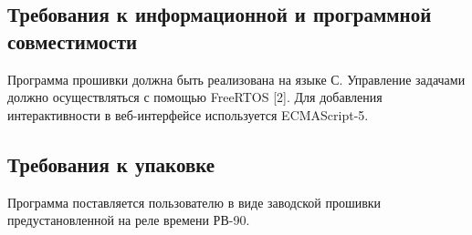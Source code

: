 \subsection{Требования к информационной и программной совместимости}
Программа прошивки должна быть реализована на языке С. Управление задачами должно осуществляться с помощью FreeRTOS [2]. Для добавления интерактивности в веб-интерфейсе используется ECMAScript-5.


\subsection{Требования к упаковке}
Программа поставляется пользователю в виде заводской прошивки предустановленной на реле времени РВ-90.

